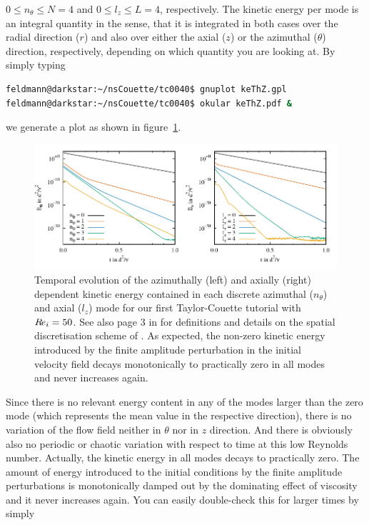 \documentclass[a4paper, 11pt, DIV=11]{scrartcl}
\begin{document}
$\num{0}\le n_{\theta}\le N=\num{4}$ and $\num{0}\le l_{z}\le L=\num{4}$,
respectively. The kinetic energy per mode is an integral quantity in the sense,
that it is integrated in both cases over the radial direction ($r$) and also
over either the axial ($z$) or the azimuthal ($\theta$) direction, respectively,
depending on which quantity you are looking at.
By simply typing
\begin{lstlisting}[language=bash]
feldmann@darkstar:~/nsCouette/tc0040$ gnuplot keThZ.gpl
feldmann@darkstar:~/nsCouette/tc0040$ okular keThZ.pdf &
\end{lstlisting}
we generate a plot as shown in figure~\ref{fig:tc0040keThZ}.
\begin{figure}[htb]
\centering
\includegraphics[scale=1.00]{figures/tc0040/keThZ.pdf}
\caption{Temporal evolution of the azimuthally (left) and axially (right) 
dependent kinetic energy contained in each discrete azimuthal ($n_{\theta}$)
and axial ($l_{z}$) mode for our first Taylor-Couette tutorial 
with $R\hspace{-0.1em}e_{i}=\num{50}$. See also page 3 in \cite{Shi2015} for definitions and 
details on the spatial discretisation scheme of \nsc. As expected, the non-zero 
kinetic energy introduced by the finite amplitude perturbation in the initial 
velocity field decays monotonically to practically zero in all modes and never 
increases again.}
\label{fig:tc0040keThZ}
\end{figure}
Since there is no relevant energy content in any of the modes larger than the zero 
mode (which represents the mean value in the respective direction), there is no
variation of the flow field neither in $\theta$ nor in $z$ direction. And there is
obviously also no periodic or chaotic variation with respect to time at this low
Reynolds number. Actually, the kinetic energy in all modes decays to practically
zero. The amount of energy introduced to the initial conditions by the finite amplitude
perturbations is monotonically damped out by the dominating effect of viscosity and it
never increases again. You can easily double-check this for larger times by simply
\end{document}
